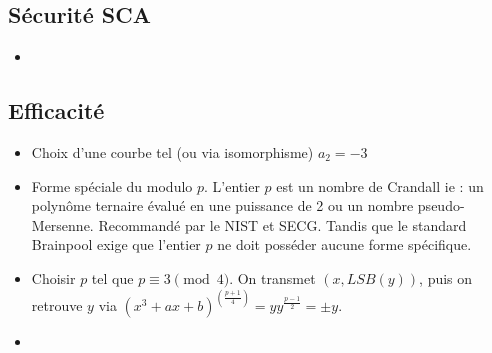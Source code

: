 \documentclass[a4paper]{report}
\begin{document}
\subsection{Sécurité SCA}
\begin{itemize}[label=$\bullet$]
    \item 
\end{itemize}

\subsection{Efficacité}
\begin{itemize}[label=$\bullet$]
    \item Choix d'une courbe tel (ou via isomorphisme) $a_2 = -3$
    \item Forme spéciale du modulo $p$. L'entier $p$ est un nombre de Crandall ie : un polynôme ternaire évalué en une puissance de 2 ou un nombre pseudo-Mersenne. Recommandé par le NIST et SECG. Tandis que le standard Brainpool exige que l'entier $p$ ne doit posséder aucune forme spécifique.
    \item Choisir $p$ tel que $p \equiv 3 \pmod 4$. On transmet $(x, LSB(y))$, puis on retrouve $y$ via $(x^3 +ax + b)^(\frac{p+1}{4}) = y y^{\frac{p-1}{2}} = \pm y$.
    \item 
\end{itemize}
\end{document}
